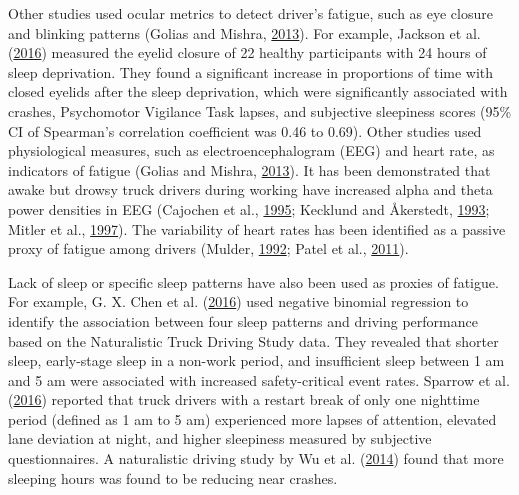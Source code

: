 \documentclass[12pt]{book}
\numberwithin{equation}{chapter}
\begin{document}
Other studies used ocular metrics to detect driver's fatigue, such as eye closure and blinking patterns (Golias and Mishra, \protect\hyperlink{ref-golias2013evaluating}{2013}). For example, Jackson et al. (\protect\hyperlink{ref-jackson2016utility}{2016}) measured the eyelid closure of 22 healthy participants with 24 hours of sleep deprivation. They found a significant increase in proportions of time with closed eyelids after the sleep deprivation, which were significantly associated with crashes, Psychomotor Vigilance Task lapses, and subjective sleepiness scores (95\% CI of Spearman's correlation coefficient was 0.46 to 0.69). Other studies used physiological measures, such as electroencephalogram (EEG) and heart rate, as indicators of fatigue (Golias and Mishra, \protect\hyperlink{ref-golias2013evaluating}{2013}). It has been demonstrated that awake but drowsy truck drivers during working have increased alpha and theta power densities in EEG (Cajochen et al., \protect\hyperlink{ref-cajochen1995power}{1995}; Kecklund and Åkerstedt, \protect\hyperlink{ref-kecklund1993sleepiness}{1993}; Mitler et al., \protect\hyperlink{ref-mitler1997sleep}{1997}). The variability of heart rates has been identified as a passive proxy of fatigue among drivers (Mulder, \protect\hyperlink{ref-mulder1992measurement}{1992}; Patel et al., \protect\hyperlink{ref-patel2011applying}{2011}).

Lack of sleep or specific sleep patterns have also been used as proxies of fatigue. For example, G. X. Chen et al. (\protect\hyperlink{ref-chen2016influence}{2016}) used negative binomial regression to identify the association between four sleep patterns and driving performance based on the Naturalistic Truck Driving Study data. They revealed that shorter sleep, early-stage sleep in a non-work period, and insufficient sleep between 1 am and 5 am were associated with increased safety-critical event rates. Sparrow et al. (\protect\hyperlink{ref-sparrow2016naturalistic}{2016}) reported that truck drivers with a restart break of only one nighttime period (defined as 1 am to 5 am) experienced more lapses of attention, elevated lane deviation at night, and higher sleepiness measured by subjective questionnaires. A naturalistic driving study by Wu et al. (\protect\hyperlink{ref-wu2014using}{2014}) found that more sleeping hours was found to be reducing near crashes.
\end{document}
